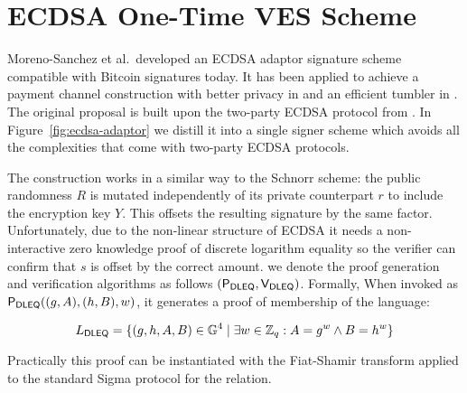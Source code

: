\section{ECDSA One-Time VES Scheme}
\label{ecdsa-ot-ves-section}

\newcommand{\Pdleq}{\pcalgostyle{P}_{\textsf{DLEQ}}}
\newcommand{\Vdleq}{\pcalgostyle{V}_{\textsf{DLEQ}}}

Moreno-Sanchez et al.\ developed an ECDSA adaptor signature scheme compatible with Bitcoin signatures today\cite{ecdsa-scriptless-scripts}.
It has been applied to achieve a payment channel construction with better privacy in \cite{cryptoeprint:2018:472} and an efficient tumbler in \cite{cryptoeprint:2019:589}.
The original proposal is built upon the two-party ECDSA protocol from \cite{Lindell2pECDSA}.
In Figure~\ref{fig:ecdsa-adaptor} we distill it into a single signer scheme which avoids all the complexities that come with two-party ECDSA protocols.

The construction works in a similar way to the Schnorr scheme: the public randomness $R$ is mutated independently of its private counterpart $r$ to include the encryption key $Y$.
This offsets the resulting signature by the same factor.
Unfortunately, due to the non-linear structure of ECDSA it needs a non-interactive zero knowledge proof of discrete logarithm equality so the verifier can confirm that $s$ is offset by the correct amount.
we denote the proof generation and verification algorithms as follows $(\Pdleq,\Vdleq)$.
Formally, When invoked as $\Pdleq((g, A),(h,B),w)$, it generates a proof of membership of the language:

\newcommand{\DLEQ}{\textsf{DLEQ}\xspace}
\[ L_{\DLEQ} = \{ (g, h, A, B) \in \G^4 \mid  \exists w \in \ZZ_q : A = g^w \land B = h^w \} \]

Practically this proof can be instantiated with the Fiat-Shamir transform applied to the standard Sigma protocol for the relation.

\newcommand{\Rx}{R_{\mathtt{x}}}
\newcommand{\hatRx}{\hat{R}_\mathtt{x}}
\newcommand{\xcoord}{f}

